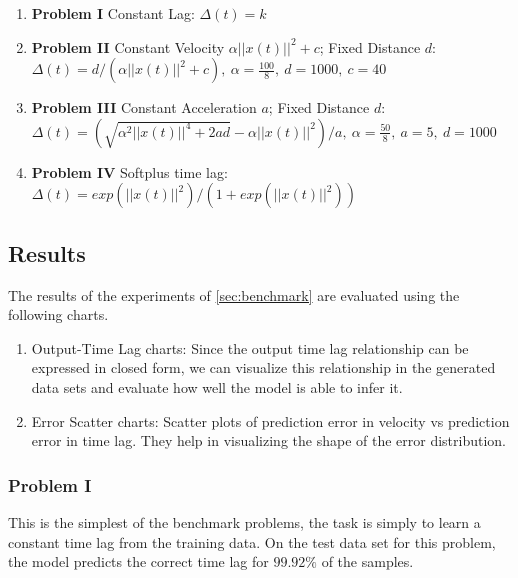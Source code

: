 \documentclass[twoside]{article}
\begin{document}
\begin{enumerate}
\item \textbf{Problem I} Constant Lag: \newline 
$\Delta(t) = k$

\item \textbf{Problem II} Constant Velocity $\alpha ||x(t)||^2 + c$; Fixed Distance $d$: 
\newline $\Delta(t) = d/(\alpha ||x(t)||^2 + c),\ \alpha = \frac{100}{8},\ d = 1000,\ c = 40$

\item \textbf{Problem III} Constant Acceleration $a$; Fixed Distance $d$: 
\newline $\Delta(t) = (\sqrt{\alpha^2||x(t)||^4 + 2ad} - \alpha||x(t)||^2)/a,\ \alpha = \frac{50}{8},\ a = 5,\ d = 1000$

\item \textbf{Problem IV} Softplus time lag: 
\newline $\Delta(t) = exp\left(||x(t)||^2\right)/\left(1 + exp(||x(t)||^2)\right)$

\end{enumerate}



\subsection{Results}

The results of the experiments of \ref{sec:benchmark} are evaluated using the following charts.

\begin{enumerate}
    \item Output-Time Lag charts: Since the output time lag relationship can be expressed in closed form, we can visualize this relationship in the generated data sets and evaluate how well the model is able to infer it.
    \item Error Scatter charts: Scatter plots of prediction error in velocity vs prediction error in time lag. They help in visualizing the shape of the error distribution.
\end{enumerate}


\subsubsection{Problem I}

This is the simplest of the benchmark problems, the task is simply to learn a constant time lag from the training data. On the test data set for this problem, the model predicts the correct time lag for $99.92\%$ of the samples. 
\end{document}
